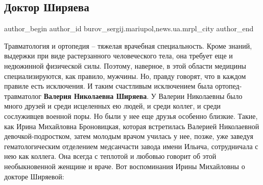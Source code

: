  
 
 
 
 
 
\subsection{Доктор Ширяева}
\label{sec:10_03_2018.stz.news.ua.mrpl_city.1.doktor_shirjaeva}
 
\ifcmt
 author_begin
   author_id burov_sergij.mariupol,news.ua.mrpl_city
 author_end
\fi


Травматология и ортопедия – тяжелая врачебная специальность. Кроме знаний,
выдержки при виде растерзанного человеческого тела, она требует еще и
недюжинной физической силы. Поэтому, наверное, в этой области медицины
специализируются, как правило, мужчины. Но, правду говорят, что в каждом
правиле есть исключения. И таким счастливым исключением была
ортопед-травматолог \textbf{Валерия Николаевна Ширяева}. У Валерии Николаевны было много
друзей и среди исцеленных ею людей, и среди коллег, и среди сослуживцев военной
поры. Но были у нее еще друзья особенно близкие. Такие, как Ирина Михайловна
Броновицкая, которая встретилась Валерией Николаевной девочкой-подростком,
затем молодым врачом училась у нее, позже, уже заведуя гематологическим
отделением медсанчасти завода имени Ильича, сотрудничала с нею как коллега. Она
всегда с теплотой и любовью говорит об этой необыкновенной женщине и враче. Вот
воспоминания Ирины Михайловны о докторе Ширяевой:

